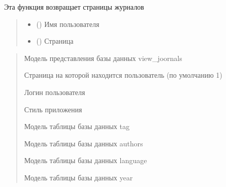\documentclass[letterpaper,10pt,russian]{sphinxmanual}
\begin{document}
\begin{fulllineitems}
\label{\detokenize{blueprints:blueprints.select_books.joornal}}
\pysigstartsignatures
{}
\pysigstopsignatures
\sphinxAtStartPar
Эта функция возвращает страницы журналов
\begin{quote}\begin{description}
\begin{itemize}
\item {} 
\sphinxAtStartPar
{} () \textendash{} Имя пользователя

\item {} 
\sphinxAtStartPar
{} () \textendash{} Страница

\end{itemize}

\end{description}\end{quote}
\begin{description}
\begin{quote}\begin{description}
\sphinxAtStartPar
Модель представления базы данных view\_joornals

\sphinxAtStartPar
Страница на которой находится пользователь (по умолчанию 1)

\sphinxAtStartPar
Логин пользователя

\sphinxAtStartPar
Стиль приложения

\sphinxAtStartPar
Модель таблицы базы данных tag

\sphinxAtStartPar
Модель таблицы базы данных authors

\sphinxAtStartPar
Модель таблицы базы данных language

\sphinxAtStartPar
Модель таблицы базы данных year


\end{description}
\end{quote}
\end{description}
\end{fulllineitems}
\end{document}

